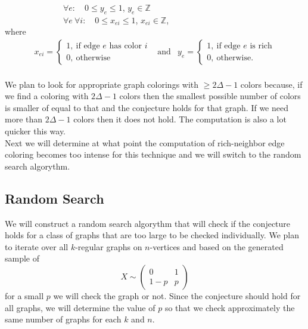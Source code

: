 \documentclass[12pt,a4paper]{amsart}
\theoremstyle{definition} %
\theoremstyle{plain} %
\newcommand{\Z}{\mathbb Z}
\begin{document}
\ \ \ \ \ \ \ \ \ \ \ \ \ \ $\forall e: \quad 0 \leq y_{e} \leq 1$, $y_{e} \in \Z$\\

\ \ \ \ \ \ \ \ \ \ \ \ \ \ $\forall e \ \forall i: \quad 0 \leq x_{ei} \leq 1$, $x_{ei} \in \Z$,\\

where
\begin{align*}        x_{ei} = \begin{cases}
            1, \  \text{if edge $e$ has color $i$} \\
            0, \  \text{otherwise}
    \end{cases} & \text{and} & 
    y_{e} = \begin{cases}
        1, \  \text{if edge $e$ is rich} \\
        0, \  \text{otherwise.}
    \end{cases}
\end{align*}\\

We plan to look for appropriate graph colorings with $\geq 2 \Delta - 1$ colors because, if we find a coloring with $2 \Delta - 1$ colors then the smallest possible number of colors is smaller of equal to that and the conjecture holds for that graph. If we need more than $2 \Delta - 1$ colors then it does not hold. The computation is also a lot quicker this way.\\

Next we will determine at what point the computation of rich-neighbor edge coloring becomes too intense for this technique and we will switch to the random search algorythm.
\pagebreak

\subsection{Random Search}

We will construct a random search algorythm that will check if the conjecture holds for a class of graphs that are too large to be checked individually. We plan to iterate over all $k$-regular graphs on $n$-vertices and based on the generated sample of 
$$
X \sim \begin{pmatrix}
    0 & 1 \\
    1 - p & p
\end{pmatrix}
$$
for a small $p$ we will check the graph or not. Since the conjecture should hold for all graphs, we will determine the value of $p$ so that we check approximately the same number of graphs for each $k$ and $n$.
\end{document}
